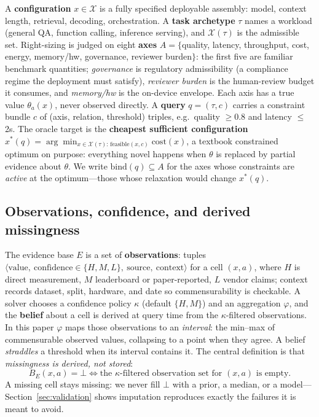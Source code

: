 \documentclass{article} %
\newcommand{\bind}{\mathrm{bind}}
\newcommand{\feasible}{\mathrm{feasible}}
\newcommand{\bbot}{\bot}
\begin{document}
A \textbf{configuration} $x \in \mathcal{X}$ is a fully specified deployable assembly: model, context length, retrieval, decoding, orchestration. A \textbf{task archetype} $\tau$ names a workload (general QA, function calling, inference serving), and $\mathcal{X}(\tau)$ is the admissible set. Right-sizing is judged on eight \textbf{axes} $A = \{$quality, latency, throughput, cost, energy, memory/hw, governance, reviewer burden$\}$: the first five are familiar benchmark quantities; \emph{governance} is regulatory admissibility (a compliance regime the deployment must satisfy), \emph{reviewer burden} is the human-review budget it consumes, and \emph{memory/hw} is the on-device envelope. Each axis has a true value $\theta_a(x)$, never observed directly. A \textbf{query} $q = (\tau, c)$ carries a constraint bundle $c$ of (axis, relation, threshold) triples, e.g.\ quality $\ge 0.8$ and latency $\le$ 2s. The oracle target is the \textbf{cheapest sufficient configuration}
$x^*(q) = \arg\min_{x \in \mathcal{X}(\tau):\,\feasible(x,c)} \mathrm{cost}(x)$,
a textbook constrained optimum on purpose: everything novel happens when $\theta$ is replaced by partial evidence about $\theta$. We write $\bind(q) \subseteq A$ for the axes whose constraints are \emph{active} at the optimum---those whose relaxation would change $x^*(q)$.

\subsection{Observations, confidence, and derived missingness}

The evidence base $E$ is a set of \textbf{observations}: tuples $\langle \text{value},\ \text{confidence} \in \{H,M,L\},\ \text{source},\ \text{context} \rangle$ for a cell $(x,a)$, where $H$ is direct measurement, $M$ leaderboard or paper-reported, $L$ vendor claims; context records dataset, split, hardware, and date so commensurability is checkable. A solver chooses a confidence policy $\kappa$ (default $\{H,M\}$) and an aggregation $\varphi$, and the \textbf{belief} about a cell is derived at query time from the $\kappa$-filtered observations. In this paper $\varphi$ maps those observations to an \emph{interval}: the min--max of commensurable observed values, collapsing to a point when they agree. A belief \emph{straddles} a threshold when its interval contains it. The central definition is that \emph{missingness is derived, not stored}:
\begin{equation}
B_E(x,a) = \bbot \iff \text{the $\kappa$-filtered observation set for $(x,a)$ is empty.}
\end{equation}
A missing cell stays missing: we never fill $\bbot$ with a prior, a median, or a model---Section~\ref{sec:validation} shows imputation reproduces exactly the failures it is meant to avoid.
\end{document}
